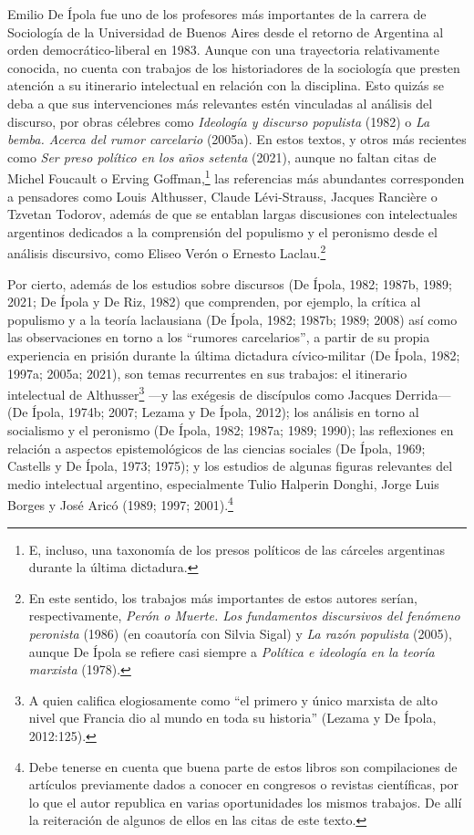 Emilio De Ípola fue uno de los profesores más importantes de la carrera de Sociología de la Universidad de Buenos Aires desde el retorno de Argentina al orden democrático-liberal en 1983. Aunque con una trayectoria relativamente conocida, no cuenta con trabajos de los historiadores de la sociología que presten atención a su itinerario intelectual en relación con la disciplina. Esto quizás se deba a que sus intervenciones más relevantes estén vinculadas al análisis del discurso, por obras célebres como \emph{Ideología y discurso populista} (1982) o \emph{La bemba. Acerca del rumor carcelario} (2005a). En estos textos, y otros más recientes como \emph{Ser preso político en los años setenta} (2021), aunque no faltan citas de Michel Foucault o Erving Goffman,\footnote{E, incluso, una taxonomía de los presos políticos de las cárceles argentinas durante la última dictadura.} las referencias más abundantes corresponden a pensadores como Louis Althusser, Claude Lévi-Strauss, Jacques Rancière o Tzvetan Todorov, además de que se entablan largas discusiones con intelectuales argentinos dedicados a la comprensión del populismo y el peronismo desde el análisis discursivo, como Eliseo Verón o Ernesto Laclau.\footnote{En este sentido, los trabajos más importantes de estos autores serían, respectivamente, \emph{Perón o Muerte. Los fundamentos discursivos del fenómeno peronista} (1986) (en coautoría con Silvia Sigal) y \emph{La razón populista} (2005), aunque De Ípola se refiere casi siempre a \emph{Política e ideología en la teoría marxista} (1978).}

Por cierto, además de los estudios sobre discursos (De Ípola, 1982; 1987b, 1989; 2021; De Ípola y De Riz, 1982) que comprenden, por ejemplo, la crítica al populismo y a la teoría laclausiana \parencite{1539-PORTANTIERO1988}(De Ípola, 1982; 1987b; 1989; 2008) así como las observaciones en torno a los \enquote{rumores carcelarios}, a partir de su propia experiencia en prisión durante la última dictadura cívico-militar (De Ípola, 1982; 1997a; 2005a; 2021), son temas recurrentes en sus trabajos: el itinerario intelectual de Althusser\footnote{A quien califica elogiosamente como \enquote{el primero y único marxista de alto nivel que Francia dio al mundo en toda su historia} (Lezama y De Ípola, 2012:125).} ---y las exégesis de discípulos como Jacques Derrida--- (De Ípola, 1974b; 2007; Lezama y De Ípola, 2012); los análisis en torno al socialismo y el peronismo (De Ípola, 1982; 1987a; 1989; 1990); las reflexiones en relación a aspectos epistemológicos de las ciencias sociales (De Ípola, 1969; Castells y De Ípola, 1973; 1975); y los estudios de algunas figuras relevantes del medio intelectual argentino, especialmente Tulio Halperin Donghi, Jorge Luis Borges y José Aricó (1989; 1997; 2001).\footnote{Debe tenerse en cuenta que buena parte de estos libros son compilaciones de artículos previamente dados a conocer en congresos o revistas científicas, por lo que el autor republica en varias oportunidades los mismos trabajos. De allí la reiteración de algunos de ellos en las citas de este texto.}

